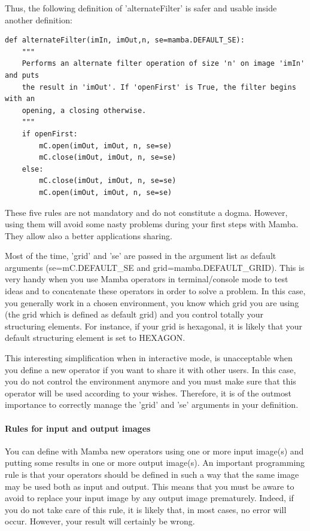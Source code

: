 \documentclass[a4paper,10pt,oneside]{article}
\begin{document}
Thus, the following definition of 'alternateFilter' is safer and usable inside 
another definition:

\lstset{language=Python}
\begin{lstlisting}
def alternateFilter(imIn, imOut,n, se=mamba.DEFAULT_SE):
    """
    Performs an alternate filter operation of size 'n' on image 'imIn' and puts
    the result in 'imOut'. If 'openFirst' is True, the filter begins with an
    opening, a closing otherwise.
    """
    if openFirst:
        mC.open(imOut, imOut, n, se=se)
        mC.close(imOut, imOut, n, se=se)
    else:
        mC.close(imOut, imOut, n, se=se)
        mC.open(imOut, imOut, n, se=se)
\end{lstlisting}

These five rules are not mandatory and do not constitute a dogma. However, 
using them will avoid some nasty problems during your first steps with Mamba. 
They allow also a better applications sharing.

Most of the time, 'grid' and 'se' are passed in the argument list as default 
arguments (se=mC.DEFAULT\_SE and grid=mamba.DEFAULT\_GRID). This is very handy 
when you use Mamba operators in terminal/console mode to test ideas and to 
concatenate these operators in order to solve a problem. In this case, you 
generally work in a chosen environment, you know which grid you are using (the 
grid which is defined as default grid) and you control totally your structuring 
elements. For instance, if your grid is hexagonal, it is likely that your 
default structuring element is set to HEXAGON.

This interesting simplification when in interactive mode, is unacceptable when 
you define a new operator if you want to share it with other users. In this 
case, you do not control the environment anymore and you must make sure that 
this operator will be used according to your wishes. Therefore, it is of the 
outmost importance to correctly manage the 'grid' and 'se' arguments in your 
definition. 
 
\paragraph{Rules for input and output images}

You can define with Mamba new operators using one or more input image(s) and 
putting some results in one or more output image(s). An important programming 
rule is that your operators should be defined in such a way that the same image 
may be used both as input and output. This means that you must be aware to 
avoid to replace your input image by any output image prematurely. Indeed, if 
you do not take care of this rule, it is likely that, in most cases, no error 
will occur. However, your result will certainly be wrong.\par
\end{document}
